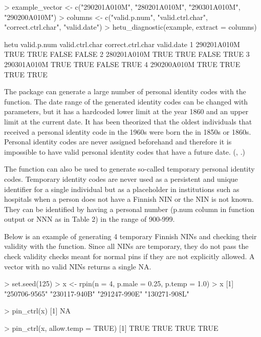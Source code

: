 \begin{example}
  > example_vector <- c("290201A010M", "280201A010M", "290301A010M", "290200A010M")
  > columns <- c("valid.p.num", "valid.ctrl.char", "correct.ctrl.char", "valid.date")
  > hetu_diagnostic(example, extract = columns)
  
           hetu valid.p.num valid.ctrl.char correct.ctrl.char valid.date
  1 290201A010M        TRUE            TRUE             FALSE      FALSE
  2 280201A010M        TRUE            TRUE             FALSE       TRUE
  3 290301A010M        TRUE            TRUE             FALSE       TRUE
  4 290200A010M        TRUE            TRUE              TRUE       TRUE
\end{example}

The  package can generate a large number of personal identity codes with the  function. The date range of the generated identity codes can be changed with parameters, but it has a hardcoded lower limit at the year 1860 and an upper limit at the current date. It has been theorized that the oldest individuals that received a personal identity code in the 1960s were born the in 1850s or 1860s. Personal identity codes are never assigned beforehand and therefore it is impossible to have valid personal identity codes that have a future date. (\citeauthor{salste2021}, \citeyear{salste2021}.)

The function can also be used to generate so-called temporary personal identity codes. Temporary identity codes are never used as a persistent and unique identifier for a single individual but as a placeholder in institutions such as hospitals when a person does not have a Finnish NIN or the NIN is not known. They can be identified by having a personal number (p.num column in  function output or NNN as in Table 2) in the range of 900-999.

Below is an example of generating 4 temporary Finnish NINs and checking their validity with the  function. Since all NINs are temporary, they do not pass the check validity checks meant for normal pins if they are not explicitly allowed. A vector with no valid NINs returns a single NA.

\begin{example}
  > set.seed(125)
  > x <- rpin(n = 4, p.male = 0.25, p.temp = 1.0)
  > x
  [1] "250706-9565" "230117-940B" "291247-990E" "130271-908L"
  
  > pin_ctrl(x)
  [1] NA
  
  > pin_ctrl(x, allow.temp = TRUE)
  [1] TRUE TRUE TRUE TRUE
\end{example}

